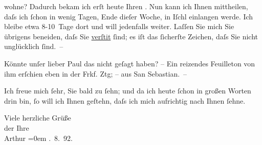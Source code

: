                wohne? Dadurch bekam ich erſt heute Ihren \label{K_L00116-2v}\label{K_L00116-2}. Nun kann ich Ihnen mittheilen, daſs
               ich{ }ſchon in wenig Tagen, Ende dieſer Woche, in Iſchl einlangen werde. Ich bleibe etwa 8-10 Tage dort und will jedenfalls
               weiter. Laſſen Sie mich Sie übrigens beneiden, {\pb}daſs
               Sie \uline{verſti{\geminationm}t}{ }ſind; es iſt das{ }ſicherſte Zeichen, daſs Sie nicht
               unglücklich{ }ſind. –\pend
           
\pstart
           Könnte unſer lieber Paul das nicht geſagt
               haben? – Ein reizendes Feuilleton von ihm erſchien eben in der Frkf. Ztg; – aus San Sebastian. –\pend
           
\pstart
           Ich freue mich{ }ſehr, Sie bald zu{ }ſehn; und da ich heute{ }ſchon in großen Worten drin
               bin,{ }ſo will ich Ihnen geſtehn, daſs ich mich aufrichtig nach Ihnen{ }ſehne.\pend
           
\pstart
           {\pb} Viele herzliche Grüße{\\[\baselineskip]}der Ihre{\\[\baselineskip]}\spacefill\mbox{Arthur}\pend
           \leftskip=0em{}
. 8. 92.\pend
           \endnumbering{}  \newcommand{\dateiname}{L00116}\newcommand{\titel}{Arthur Schnitzler an Richard Beer-Hofmann, 22. 8. 1892}\newcommand{\editorInnen}{Martin Anton Müller und Gerd-Hermann Susen}
